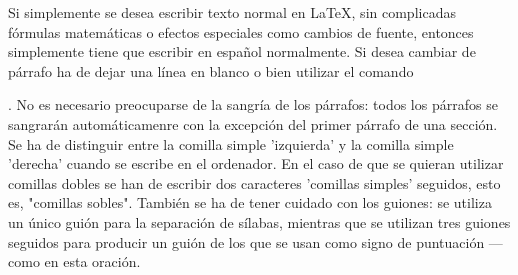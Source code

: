 \documentclass[a4paper,10pt]{letter}
\begin{document}
Si simplemente se desea escribir texto normal en LaTeX, 
sin complicadas fórmulas matemáticas o efectos especiales
como cambios de fuente, entonces simplemente tiene que escribir
en español normalmente.
Si desea cambiar de párrafo ha de dejar una línea en blanco o bien
utilizar el comando \par.
No es necesario preocuparse de la sangría de los párrafos:
todos los párrafos se sangrarán automáticamenre con la excepción
del primer párrafo de una sección.
Se ha de distinguir entre la comilla simple 'izquierda'
y la comilla simple 'derecha' cuando se escribe en el ordenador.
En el caso de que se quieran utilizar comillas dobles se han de
escribir dos caracteres 'comillas simples' seguidos, esto es,
"comillas sobles".
También se ha de tener cuidado con los guiones: se utiliza un único
guión para la separación de sílabas, mientras que se utilizan 
tres guiones seguidos para producir un guión de los que se usan 
como signo de puntuación --- como en esta oración.
\end{document}
